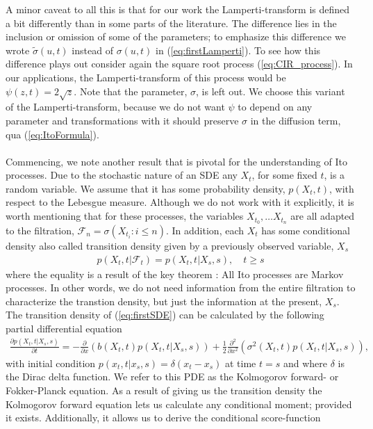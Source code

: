A minor caveat to all this is that for our work the Lamperti-transform is defined a bit differently than in some parts of the literature. The difference lies in the inclusion or omission of some of the parameters; to emphasize this difference we wrote $\tilde{\sigma}(u, t)$ instead of $\sigma(u, t)$ in (\ref{eq:firstLamperti}). To see how this difference plays out consider again the square root process (\ref{eq:CIR_process}). In our applications, the Lamperti-transform of this process would be $\psi(z,t) = 2\sqrt{z}$. Note that the parameter, $\sigma$, is left out. We choose this variant of the Lamperti-transform, because we do not want $\psi$ to depend on any parameter and transformations with it should preserve $\sigma$ in the diffusion term, qua (\ref{eq:ItoFormula}).\\\\
Commencing, we note another result that is pivotal for the understanding of Ito processes. Due to the stochastic nature of an SDE any $X_t$, for some fixed $t$, is a random variable. We assume that it has some probability density, $p(X_t, t)$, with respect to the Lebesgue measure. Although we do not work with it explicitly, it is worth mentioning that for these processes, the variables $X_{t_0}, \dots X_{t_n}$ are all adapted to the filtration, $\mathcal{F}_n = \sigma\left(X_{t_i}: i \leq n\right)$. In addition, each $X_t$ has some conditional density also called transition density given by a previously observed variable, $X_s$ 
\begin{align}
    p(X_t, t| \mathcal{F}_t) = p(X_t, t | X_s, s), \quad t\geq s
\end{align}
where the equality is a result of the key theorem \cite[theorem 7.1.2]{Oksendal2003_yu}: All Ito processes are Markov processes. In other words, we do not need information from the entire filtration to characterize the transtion density, but just the information at the present, $X_s$. The transition density of (\ref{eq:firstSDE}) can be calculated by the following partial differential equation
\begin{align}
    \frac{\partial p(X_t, t | X_s, s)}{\partial t} = -\frac{\partial}{\partial x}\left(b(X_t, t)p(X_t, t | X_s, s)\right) + \frac{1}{2}\frac{\partial^2}{\partial x^2}\left(\sigma^2(X_t, t)p(X_t, t | X_s, s)\right),\label{eq:fokkerPlanck} 
\end{align}
with initial condition $p(x_t, t|x_s, s) = \delta(x_t - x_s)$ at time $t = s$ and where $\delta$ is the Dirac delta function. We refer to this PDE as the Kolmogorov forward- or Fokker-Planck equation. As a result of giving us the transition density the Kolmogorov forward equation lets us calculate any conditional moment; provided it exists. Additionally, it allows us to derive the conditional score-function
